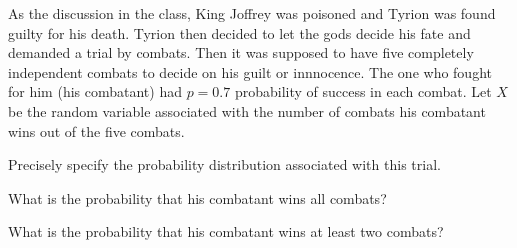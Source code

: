 \documentclass[addpoints]{examsetup}
\begin{document}
\begin{questions}
         
\pagebreak

\question
As the discussion in the class, King Joffrey was poisoned and Tyrion was found guilty  for his death. Tyrion then decided to let the gods decide his fate and demanded a trial by combats. Then it was supposed to have five completely independent combats to decide on his guilt or innnocence. The one who fought for him (his combatant) had $p= 0.7$ probability of success in each combat.  Let $X$ be the random variable associated with the number of combats his combatant wins out of the five combats.

         \begin{subparts}
               \subpart[2] Precisely specify the probability distribution associated with this trial.
               \vspace{2cm}
               
               \subpart[3] What is the probability that his combatant wins all combats?
               \hfill {}
               \vspace{4cm}
               
               \subpart[3] What is the probability that his combatant wins at least two combats?
               \hfill {}
               \vspace{6cm}       
               

\end{subparts}
\end{questions}
\end{document}

